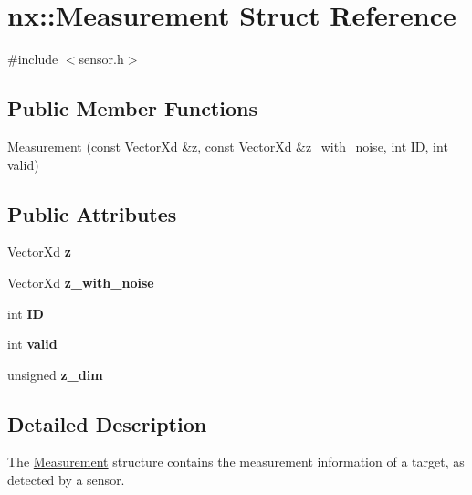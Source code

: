 \hypertarget{structnx_1_1Measurement}{}\section{nx\+:\+:Measurement Struct Reference}
\label{structnx_1_1Measurement}


{\ttfamily \#include $<$sensor.\+h$>$}

\subsection*{Public Member Functions}
\begin{DoxyCompactItemize}
\item 
\hyperlink{structnx_1_1Measurement_abaa990110b3febfee67588a478b76463}{Measurement} (const Vector\+Xd \&z, const Vector\+Xd \&z\+\_\+with\+\_\+noise, int ID, int valid)
\end{DoxyCompactItemize}
\subsection*{Public Attributes}
\begin{DoxyCompactItemize}
\item 
\mbox{\label{structnx_1_1Measurement_a6c3fd2bb2a0dd31f38b32dfb50fdadfe}} 
Vector\+Xd {\bfseries z}
\item 
\mbox{\label{structnx_1_1Measurement_a7af6783ecf425dbab85b01a888c8a44d}} 
Vector\+Xd {\bfseries z\+\_\+with\+\_\+noise}
\item 
\mbox{\label{structnx_1_1Measurement_a820725d94b788f3d37cc466944bb56cf}} 
int {\bfseries ID}
\item 
\mbox{\label{structnx_1_1Measurement_a3be8fbe12c51296f5368ddc7b095007a}} 
int {\bfseries valid}
\item 
\mbox{\label{structnx_1_1Measurement_af6f13cd66b167d8106134c37ac001e68}} 
unsigned {\bfseries z\+\_\+dim}
\end{DoxyCompactItemize}


\subsection{Detailed Description}
The \hyperlink{structnx_1_1Measurement}{Measurement} structure contains the measurement information of a target, as detected by a sensor. 

